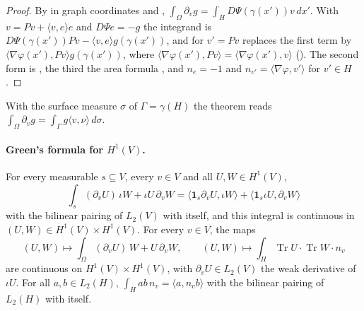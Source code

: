 \begin{proof}
\leanok
By  in graph coordinates and ,
$\int_\Omega \partial_v g = \int_H D\Psi(\gamma(x')) v \, dx'$. With
$v = Pv + \langle v, e \rangle e$ and $D\Psi e = -g$ the integrand is
$D\Psi(\gamma(x')) Pv - \langle v, e \rangle g(\gamma(x'))$, and 
for $v' = Pv$ replaces the first term by $\langle \nabla\varphi(x'), Pv \rangle g(\gamma(x'))$,
where $\langle \nabla\varphi(x'), Pv \rangle = \langle \nabla\varphi(x'), v \rangle$
(). The second form is , the third the area
formula , and $n_e = -1$ and
$n_{v'} = \langle \nabla\varphi, v' \rangle$ for $v' \in H$.
\end{proof}

With the surface measure $\sigma$ of $\Gamma = \gamma(H)$ the theorem reads
$\int_\Omega \partial_v g = \int_\Gamma g \langle v, \nu \rangle \, d\sigma$.

\paragraph{Green's formula for $H^1(V)$.}

\begin{lemma}
\label{lem:green-continuous}
\leanok
{}
For every measurable $s \subseteq V$, every $v \in V$ and all $U, W \in H^1(V)$,
\[
  \int_s (\partial_v U) \, \iota W + \iota U \, \partial_v W
  = \langle \mathbf 1_s \partial_v U, \iota W \rangle + \langle \mathbf 1_s \iota U,
    \partial_v W \rangle
\]
with the bilinear pairing of $L_2(V)$ with itself, and this integral is continuous in
$(U, W) \in H^1(V) \times H^1(V)$. For every $v \in V$, the maps
\[
  (U, W) \mapsto \int_\Omega (\partial_v U) \, W + U \, \partial_v W ,
  \qquad
  (U, W) \mapsto \int_H \operatorname{Tr} U \cdot \operatorname{Tr} W \cdot n_v
\]
are continuous on $H^1(V) \times H^1(V)$, with $\partial_v U \in L_2(V)$ the weak derivative of
$\iota U$. For all $a, b \in L_2(H)$,
$\int_H a b \, n_v = \langle a, n_v b \rangle$ with the bilinear pairing of $L_2(H)$ with itself.
\end{lemma}

